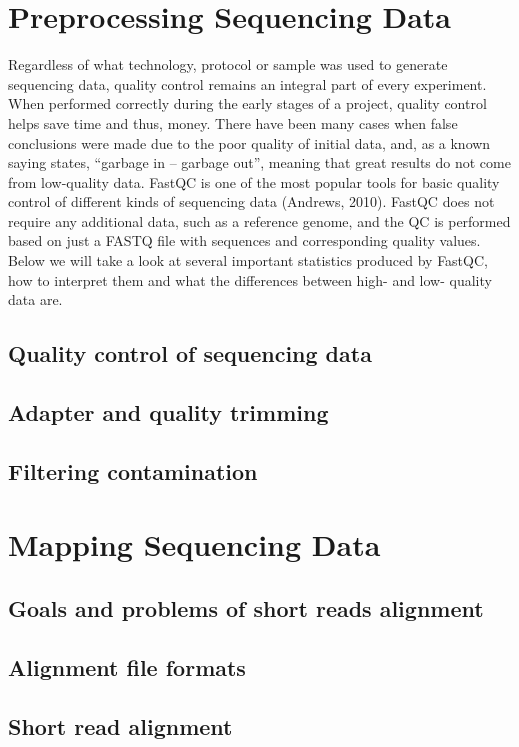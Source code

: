 \section{Preprocessing Sequencing Data}
Regardless of what technology, protocol or sample was used to generate sequencing data, quality control remains an integral part
of every experiment. When performed correctly during the early stages of a project, quality control helps save time and thus,
money. There have been many cases when false conclusions were made due to the poor quality of initial data, and, as a known
saying states, “garbage in – garbage out”, meaning that great results do not come from low-quality data.
FastQC is one of the most popular tools for basic quality control of different kinds of sequencing data (Andrews, 2010).
FastQC does not require any additional data, such as a reference genome, and the QC is performed based on just a FASTQ file with
sequences and corresponding quality values. Below we will take a look at several important statistics produced by FastQC, how to
interpret them and what the differences between high- and low- quality data are.



\subsection{Quality control of sequencing data}  


\subsection{Adapter and quality trimming} 


\subsection{Filtering contamination} 

\section{Mapping Sequencing Data} 
\subsection{Goals and problems of short reads alignment} 
\subsection{Alignment file formats} 
\subsection{Short read alignment} 
